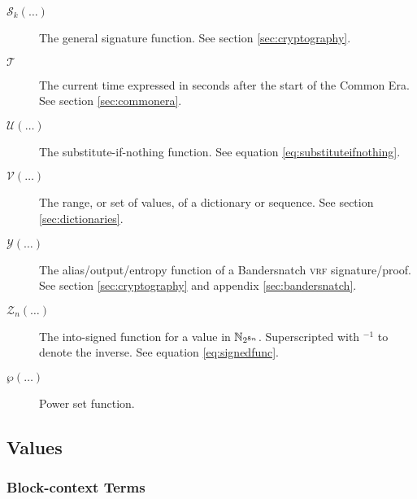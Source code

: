 \begin{description}
  \item[$\mathcal{S}_k(\dots)$] The general signature function. See section \ref{sec:cryptography}.
  \item[$\mathcal{T}$] The current time expressed in seconds after the start of the \Jam Common Era. See section \ref{sec:commonera}.
  \item[$\mathcal{U}(\dots)$] The substitute-if-nothing function. See equation \ref{eq:substituteifnothing}.
  \item[$\mathcal{V}(\dots)$] The range, or set of values, of a dictionary or sequence. See section \ref{sec:dictionaries}.
  \item[$\mathcal{Y}(\dots)$] The alias/output/entropy function of a Bandersnatch \textsc{vrf} signature/proof. See section \ref{sec:cryptography} and appendix \ref{sec:bandersnatch}.
  \item[$\mathcal{Z}_n(\dots)$] The into-signed function for a value in $\mathbb{N}_{2^{8n}}$. Superscripted with ${}^{-1}$ to denote the inverse. See equation \ref{eq:signedfunc}.
  \item[$\wp(\dots)$] Power set function.
\end{description}

\subsection{Values}

\subsubsection{Block-context Terms}

